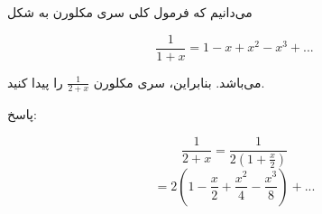 می‌دانیم که فرمول کلی سری مکلورن به شکل 

$$\frac{1}{1 + x} = 1  - x + x^{2} - x^{3} + ...$$

می‌باشد. بنابراین، سری مکلورن $\frac{1}{2 + x}$ را پیدا کنید.

\begin{comment}
\end{comment}
پاسخ:


    $$\frac{1}{2 + x} = \frac{1}{2 (1 + \frac{x}{2})}$$
    $$= 2 (1 - \frac{x}{2} + \frac{x^{2}}{4} - \frac{x^{3}}{8}) + ...$$



